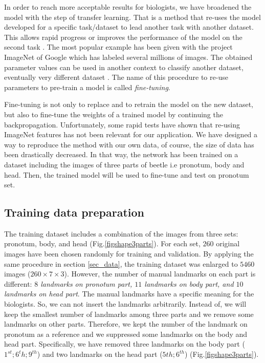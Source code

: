 \documentclass[10pt]{article}
\begin{document}
In order to reach more acceptable results for biologists, we have
broadened the model with the step of transfer learning. That is a
method that re-uses the model developed for a specific task/dataset
to lead  another task with another dataset. This allows rapid progress or improves the performance of the
model on the second task \cite{torrey2009transfer}. The most popular
example has been given with the project ImageNet of Google \cite{imagenet_cvpr09} which has labeled several millions of images. The obtained parameter values can
be used in another context to classify another dataset, eventually
very different dataset \cite{margeta_mri}. The name of this procedure to re-use parameters
to pre-train a model is called \textit{fine-tuning}.

Fine-tuning is not only to replace and to retrain the model on the new
dataset, but also to fine-tune the weights of a trained model by continuing the
backpropagation. Unfortunately, some rapid tests have shown that
re-using ImageNet features has not been relevant for our
application. We have designed a way to reproduce the method with our
own data, of course, the size of data has been drastically decreased.
In that way, the network has been trained on a dataset including
the images of three parts of beetle i.e pronotum, body and head. Then,
the trained model will be used to fine-tune and test on pronotum set.


\subsection{Training data preparation}
The training dataset includes a combination of the images from three
sets: pronotum, body, and head (Fig.\ref{figshape3parts}). For each
set, $260$ original images have been chosen randomly for training and
validation. By applying the same procedure in section \ref{sec_data},
the training dataset was enlarged to $5460$ images ($260 \times 7
\times 3$). However, the number of manual landmarks on each part is
different: \textit{$8$ landmarks on pronotum part, $11$ landmarks on
  body part, and $10$ landmarks on head part}. The manual landmarks
have a specific meaning for the biologists. So, we can not insert the
landmarks arbitrarily. Instead of, we will keep the smallest number of
landmarks among three parts and we remove some landmarks on other
parts. Therefore, we kept the number of the landmark on pronotum as a
reference and we suppressed some landmarks on the body and head
part. Specifically, we have removed three landmarks on the body part
($1^{st}; 6^{t}h; 9^{th}$) and two landmarks on the head part ($5{th};
6^{th}$) (Fig.\ref{figshape3parts}).
\end{document}
